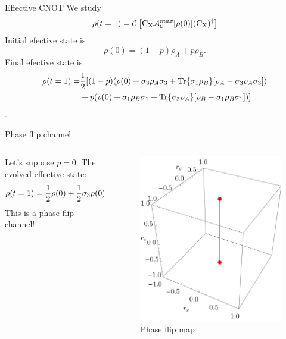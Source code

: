 \begin{frame}{Effective CNOT}
    We study
    \begin{equation*}
        \rho(t=1)=\mathcal{C}\left[\text{C}_{\text{X}} \mathcal{A}_{\mathcal{C}}^{max}[\rho(0)](\text{C}_{\text{X}})^{\dag}\right]
    \end{equation*}
    Initial efective state is
    \begin{equation*}
        \rho(0)=(1-p)\rho_{A}+p\rho_{B}.
    \end{equation*}
    Final efective state is
    \begin{align*}
        \rho(t=1)=&\frac{1}{2}[(1-p)(\rho(0)+\sigma_{3}\rho_{A}\sigma_{3}+\Tr{\sigma_{1}\rho_{B}}[\rho_{A}-\sigma_{3}\rho_{A}\sigma_{3}])\\
        &+p(\rho(0)+\sigma_{1}\rho_{B}\sigma_{1}+\Tr{\sigma_{3}\rho_{A}}[\rho_{B}-\sigma_{1}\rho_{B}\sigma_{1}])]
    \end{align*}.
\end{frame}
\begin{frame}{Phase flip channel}
    \begin{columns}
        \begin{column}{0.5\textwidth}
            Let's suppose $p=0$. The evolved effective state:
            \begin{equation*}
              \rho(t=1)=\frac{1}{2}\rho(0)+\frac{1}{2}\sigma_{3}\rho(0)\sigma_{3}.
            \end{equation*}
            This is a phase flip channel!
        \end{column}
        \begin{column}{0.5\textwidth}
            \begin{figure}[h!]
                \centering
                \includegraphics[width=0.7\linewidth]{figures/maxent_results/CNOT_p=1._t=1_r=0.9.png}
                \caption{Phase flip map}
                \label{fig:SWAPFactor2D}
              \end{figure}
        \end{column}
    \end{columns}
\end{frame}
